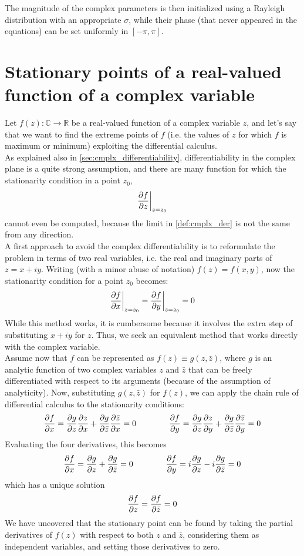\documentclass[../main.tex]{subfiles}
\begin{document}
The magnitude of the complex parameters is then initialized using a Rayleigh distribution with an appropriate $\sigma$, while their phase (that never appeared in the equations) can be set uniformly in $[-\pi, \pi]$.


\section{Stationary points of a real-valued function of a complex variable \cite{Messerschmitt_stationary_points}}

Let $f(z):\mathds{C}\to\mathds{R}$ be a real-valued function of a complex variable $z$, and let's say that we want to find the extreme points of $f$ (i.e. the values of $z$ for which $f$ is maximum or minimum) exploiting the differential calculus.\\
As explained also in \ref{sec:cmplx_differentiability}, differentiability in the complex plane is a quite strong assumption, and there are many function for which the stationarity condition in a point $z_0$, 
\[ \pdv{f}{z}\bigg|_{z=z_0} \]
cannot even be computed, because the limit in \ref{def:cmplx_der} is not the same from any direction.\\

A first approach to avoid the complex differentiability is to reformulate the problem in terms of two real variables, i.e. the real and imaginary parts of $z = x+iy$. Writing (with a minor abuse of notation) $f(z) = f(x,y)$, now the stationarity condition for a point $z_0$ becomes:
\[ \pdv{f}{x}\bigg|_{z=z_0} = \pdv{f}{y}\bigg|_{z=z_0} = 0 \]
While this method works, it is cumbersome because it involves the extra step of
substituting $x+iy$ for $z$. Thus, we seek an equivalent method that works directly with
the complex variable.\\

Assume now that $f$ can be represented as $f(z)\equiv g(z, \bar{z})$, where $g$ is an analytic function of two complex variables $z$ and $\bar{z}$ that can be freely differentiated with respect to its arguments (because of the assumption of analyticity). Now, substituting $g(z, \bar{z})$ for $f(z)$, we can apply the chain rule of differential calculus to the stationarity conditions:
\[ \pdv{f}{x} = \pdv{g}{z}\pdv{z}{x} + \pdv{g}{\bar{z}}\pdv{\bar{z}}{x} = 0 \qquad\qquad \pdv{f}{y} = \pdv{g}{z}\pdv{z}{y} + \pdv{g}{\bar{z}}\pdv{\bar{z}}{y} = 0 \]
Evaluating the four derivatives, this becomes
\[ \pdv{f}{x} = \pdv{g}{z} + \pdv{g}{\bar{z}} = 0 \qquad\qquad \pdv{f}{y} = i\pdv{g}{z} -i\pdv{g}{\bar{z}} = 0 \]
which has a unique solution
\[ \pdv{f}{z} = \pdv{f}{\bar{z}} = 0 \]
We have uncovered that the stationary point can be found by taking the partial derivatives
of $f(z)$ with respect to both $z$ and $\bar{z}$, considering them as independent variables, and setting
those derivatives to zero.\\
\end{document}

